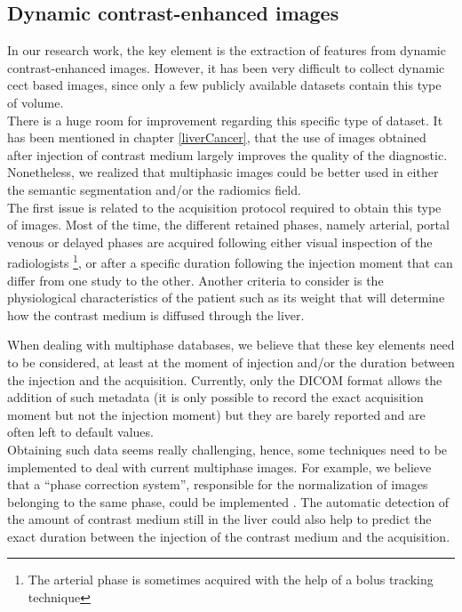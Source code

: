 \subsection*{Dynamic contrast-enhanced images}
\label{subsec:DCE}

In our research work, the key element is the extraction of features
from dynamic contrast-enhanced images. However, it has been very
difficult to collect dynamic \ac{cect} based images, since only a few
publicly available datasets contain this type of volume. \\
There is a huge room for improvement regarding this specific type of
dataset. It has been mentioned in chapter \ref{liverCancer}, that the
use of images obtained after injection of contrast medium largely
improves the quality of the diagnostic.
Nonetheless, we realized that multiphasic images could be better used in
either the semantic segmentation and/or the radiomics field.\\
The first issue is related to the acquisition protocol required to
obtain this type of images. Most of the time, the different retained
phases, namely arterial, portal venous or delayed phases are acquired
following either visual inspection of the radiologists \footnote{The arterial phase is sometimes acquired
with the help of a bolus tracking technique}, or after a specific
duration following the injection moment that can differ from one study
to the other. Another criteria to consider is the physiological
characteristics of the patient such as its weight that will determine
how the contrast medium is diffused through the liver.

When dealing with multiphase databases, we believe that these key
elements need to be considered, at least at the moment of injection and/or
the duration between the injection and the acquisition.  
Currently, only the DICOM
format allows the addition of such metadata (it is only possible to record 
the exact acquisition moment but not the injection moment) 
but they are barely reported and
are often left to default values.\\
Obtaining such data seems really challenging, hence, some techniques
need to be implemented to deal with current multiphase images. 
For example, we believe that a ``phase correction system'', responsible for 
the normalization of images belonging to the same phase, could be
implemented . The automatic detection of the amount of contrast medium still in
the liver could also help to predict the exact duration between the
injection of the contrast medium and the acquisition.

